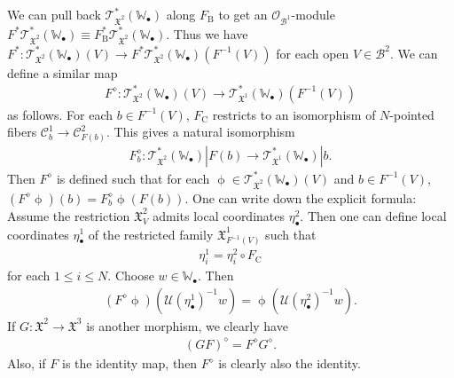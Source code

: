 \documentclass[12pt,a4paper,notitlepage]{report}
\theoremstyle{definition}
\theoremstyle{plain}
\newcommand{\fk}{\mathfrak}
\newcommand{\mc}{\mathcal}
\newcommand{\scr}{\mathscr}
\newcommand{\blt}{\bullet}
\newcommand{\Wbb}{\mathbb W}
\newcommand{\Crm}{\mathrm C}
\newcommand{\Brm}{\mathrm B}
\numberwithin{equation}{section}
\begin{document}
We can pull back $\scr T_{\fk X^2}^*(\Wbb_\blt)$ along $F_\Brm$ to get an $\scr O_{\mc B^1}$-module $F^*\scr T_{\fk X^2}^*(\Wbb_\blt)\equiv F_\Brm^*\scr T_{\fk X^2}^*(\Wbb_\blt)$. Thus we have $F^*:\scr T_{\fk X^2}^*(\Wbb_\blt)(V)\rightarrow F^*\scr T_{\fk X^2}^*(\Wbb_\blt)(F^{-1}(V))$ for each open $V\in\mc B^2$. We can define a similar  map 
\begin{align}
F^\diamond:\scr T_{\fk X^2}^*(\Wbb_\blt)(V)\rightarrow \scr T_{\fk X^1}^*(\Wbb_\blt)(F^{-1}(V))
\end{align}
as follows.  For each $b\in F^{-1}(V)$, $F_\Crm$ restricts to an isomorphism of $N$-pointed fibers $\mc C^1_b\rightarrow\mc C^2_{F(b)}$. This gives a natural isomorphism
\begin{align*}
F_b^\diamond:\scr T_{\fk X^2}^*(\Wbb_\blt)|F(b)\rightarrow \scr T_{\fk X^1}^*(\Wbb_\blt)|b.
\end{align*}
Then $F^\diamond$ is defined such that for each $\upphi\in\scr T_{\fk X^2}^*(\Wbb_\blt)(V)$ and $b\in F^{-1}(V)$, $(F^\diamond\upphi)(b)=F_b^\diamond\upphi(F(b))$. One can write down the explicit formula: Assume the restriction $\fk X^2_V$ admits local coordinates $\eta_\blt^2$. Then one can define local coordinates $\eta_\blt^1$ of the restricted family $\fk X^1_{F^{-1}(V)}$ such that 
\begin{align}
\eta_i^1=\eta_i^2\circ F_\Crm
\end{align}
for each $1\leq i\leq N$. Choose $w\in\Wbb_\blt$. Then
\begin{align}
(F^\diamond\upphi)(\mc U(\eta_\blt^1)^{-1}w)=\upphi(\mc U(\eta_\blt^2)^{-1}w).\label{eq261}
\end{align}
If $G:\fk X^2\rightarrow\fk X^3$ is another morphism, we clearly have
\begin{align}
(GF)^\diamond=F^\diamond G^\diamond.\label{eq262}
\end{align}
Also, if $F$ is the identity map, then $F^\diamond$ is clearly also the identity.
\end{document}
